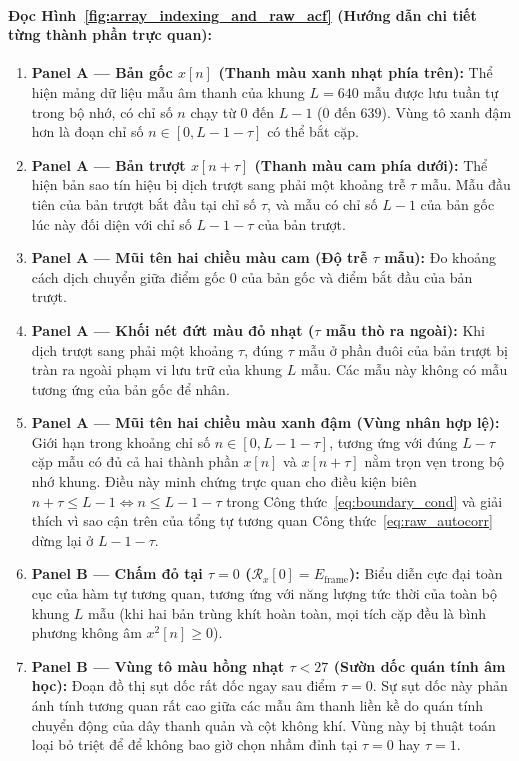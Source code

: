\documentclass[11pt,a4paper]{article}
\begin{document}
\paragraph{Đọc Hình~\ref{fig:array_indexing_and_raw_acf} (Hướng dẫn chi tiết từng thành phần trực quan):}
\begin{enumerate}
    \setlength{\itemsep}{1.5pt}
    \item \textbf{Panel A --- Bản gốc $x[n]$ (Thanh màu xanh nhạt phía trên):} Thể hiện mảng dữ liệu mẫu âm thanh của khung $L = 640$ mẫu được lưu tuần tự trong bộ nhớ, có chỉ số $n$ chạy từ $0$ đến $L - 1$ ($0$ đến $639$). Vùng tô xanh đậm hơn là đoạn chỉ số $n \in [0, L - 1 - \tau]$ có thể bắt cặp.
    \item \textbf{Panel A --- Bản trượt $x[n+\tau]$ (Thanh màu cam phía dưới):} Thể hiện bản sao tín hiệu bị dịch trượt sang phải một khoảng trễ $\tau$ mẫu. Mẫu đầu tiên của bản trượt bắt đầu tại chỉ số $\tau$, và mẫu có chỉ số $L - 1$ của bản gốc lúc này đối diện với chỉ số $L - 1 - \tau$ của bản trượt.
    \item \textbf{Panel A --- Mũi tên hai chiều màu cam (Độ trễ $\tau$ mẫu):} Đo khoảng cách dịch chuyển giữa điểm gốc $0$ của bản gốc và điểm bắt đầu của bản trượt.
    \item \textbf{Panel A --- Khối nét đứt màu đỏ nhạt ($\tau$ mẫu thò ra ngoài):} Khi dịch trượt sang phải một khoảng $\tau$, đúng $\tau$ mẫu ở phần đuôi của bản trượt bị tràn ra ngoài phạm vi lưu trữ của khung $L$ mẫu. Các mẫu này không có mẫu tương ứng của bản gốc để nhân.
    \item \textbf{Panel A --- Mũi tên hai chiều màu xanh đậm (Vùng nhân hợp lệ):} Giới hạn trong khoảng chỉ số $n \in [0, L - 1 - \tau]$, tương ứng với đúng $L - \tau$ cặp mẫu có đủ cả hai thành phần $x[n]$ và $x[n+\tau]$ nằm trọn vẹn trong bộ nhớ khung. Điều này minh chứng trực quan cho điều kiện biên $n + \tau \le L - 1 \iff n \le L - 1 - \tau$ trong Công thức~\eqref{eq:boundary_cond} và giải thích vì sao cận trên của tổng tự tương quan Công thức~\eqref{eq:raw_autocorr} dừng lại ở $L - 1 - \tau$.
    \item \textbf{Panel B --- Chấm đỏ tại $\tau = 0$ ($\mathcal{R}_x[0] = E_{\text{frame}}$):} Biểu diễn cực đại toàn cục của hàm tự tương quan, tương ứng với năng lượng tức thời của toàn bộ khung $L$ mẫu (khi hai bản trùng khít hoàn toàn, mọi tích cặp đều là bình phương không âm $x^2[n] \ge 0$).
    \item \textbf{Panel B --- Vùng tô màu hồng nhạt $\tau < 27$ (Sườn dốc quán tính âm học):} Đoạn đồ thị sụt dốc rất dốc ngay sau điểm $\tau = 0$. Sự sụt dốc này phản ánh tính tương quan rất cao giữa các mẫu âm thanh liền kề do quán tính chuyển động của dây thanh quản và cột không khí. Vùng này bị thuật toán loại bỏ triệt để để không bao giờ chọn nhầm đỉnh tại $\tau = 0$ hay $\tau = 1$.

\end{enumerate}
\end{document}
